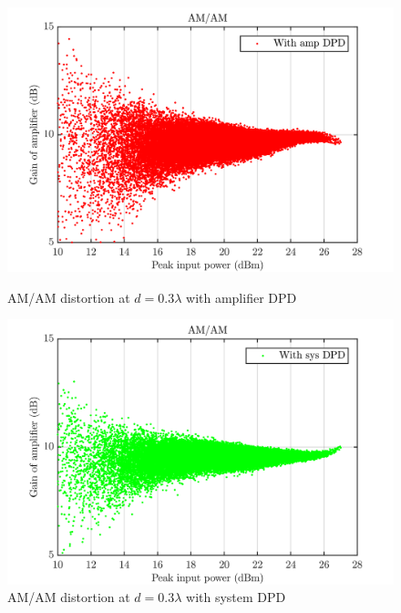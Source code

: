 \begin{figure}[H]
  \centering
  \begin{minipage}[b]{0.5\textwidth}
	\includegraphics[scale = 0.5]{figures/measurement/cree/meas3/amam_amp_dpd_0p3.png}
	\caption{AM/AM distortion at $d = 0.3\lambda$ with amplifier DPD}	
    \label{fig:meas4_amam5}
  \end{minipage}
  \hfill
  \begin{minipage}[b]{0.4\textwidth}
	\includegraphics[scale = 0.5]{figures/measurement/cree/meas3/amam_sys_dpd_0p3.png}
	\caption{AM/AM distortion at $d = 0.3\lambda$ with system DPD}
    \label{fig:meas4_amam6}
  \end{minipage}
\end{figure}

